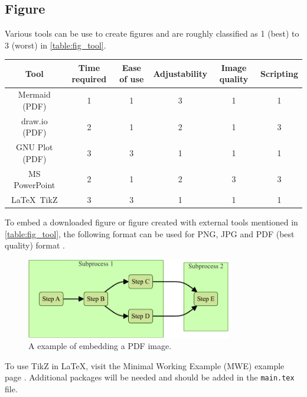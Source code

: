 \subsection{Figure}

Various tools can be use to create figures and are roughly classified as 1 (best) to 3 (worst) in \autoref{table:fig_tool}.

\begin{center}
    \label{table:fig_tool}
    \begin{tabular}{ c c c c c c }
        \toprule
        Tool & Time required & Ease of use & Adjustability & Image quality & Scripting \\
        \midrule
        Mermaid (PDF) \cite{mermaid} & 1 & 1 & 3 & 1 & 1 \\
        draw.io (PDF) \cite{drawio} & 2 & 1 & 2 & 1 & 3 \\
        GNU Plot (PDF) \cite{gnuplot} & 3 & 3 & 1 & 1 & 1 \\
        MS PowerPoint & 2 & 1 & 2 & 3 & 3 \\
        \LaTeX\ TikZ \cite{tikz} & 3 & 3 & 1 & 1 & 1 \\
        \bottomrule
    \end{tabular}
\end{center}

To embed a downloaded figure or figure created with external tools mentioned in \autoref{table:fig_tool}, the following format can be used for PNG, JPG and PDF (best quality) format \cite{inserting_img}.

\begin{figure}[H]
    \centering
    \includegraphics[width=0.8\textwidth]{../figure/mermaid_out/flowchart.pdf}
    \caption{A example of embedding a PDF image.}
    \label{fig:embed_pdf}
\end{figure}

To use TikZ in \LaTeX, visit the Minimal Working Example (MWE) example page \cite{tikz_example}. Additional packages will be needed and should be added in the \texttt{main.tex} file.

